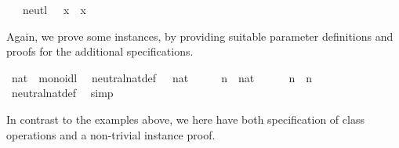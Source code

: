 \begin{isabellebody}
\ \ \ neutl{}\ {}{}\ {}\ x\ {}\ x{}%
\begin{isamarkuptext}%
\noindent Again, we prove some instances, by providing
suitable parameter definitions and proofs for the additional
specifications.%
\end{isamarkuptext}%
\isamarkuptrue%
\isamarkupfalse%
\ nat\ {}{}\ monoidl\isanewline
{}\isanewline
\isanewline
{}\isamarkupfalse%
\isanewline
\ \ neutral{}nat{}def{}\ {}{}\ {}\ {}{}{}nat{}{}\isanewline
\isanewline
{}\isamarkupfalse%
%
\isadelimproof
\ %
\endisadelimproof
%
\isatagproof
{}\isamarkupfalse%
\isanewline
\ \ \isamarkupfalse%
\ n\ {}{}\ nat\isanewline
\ \ \isamarkupfalse%
\ {}{}\ {}\ n\ {}\ n{}\isanewline
\ \ \ \ \isamarkupfalse%
\ neutral{}nat{}def\ \isamarkupfalse%
\ simp\isanewline
{}\isamarkupfalse%
%
\endisatagproof
{\isafoldproof}%
%
\isadelimproof
%
\endisadelimproof
\isanewline
\isanewline
{}\isamarkupfalse%
%
\begin{isamarkuptext}%
\noindent In contrast to the examples above, we here have both
specification of class operations and a non-trivial instance proof.


\end{isamarkuptext}
\end{isabellebody}
